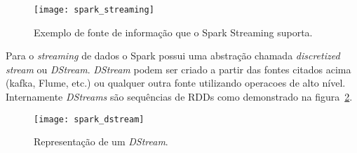 \begin{figure}[!h]
	\caption{\label{fig:sparkstreaming} Exemplo de fonte de informação que o Spark Streaming suporta.}
	\begin{center}
		\texttt{[image: spark\_streaming]}
	\end{center}
\end{figure}

Para o \textit{streaming} de dados o Spark possui uma abstração chamada \textit{discretized stream} ou \textit{DStream}. \textit{DStream} podem ser criado a partir das fontes citados acima (kafka, Flume, etc.) ou qualquer outra fonte utilizando operacoes de alto nível. Internamente \textit{DStreams} são sequências de RDDs como demonstrado na figura~\ref{fig:sparkdstream}.

\begin{figure}[!h]
	\caption{\label{fig:sparkdstream} Representação de um \textit{DStream}.}
	\begin{center}
		\texttt{[image: spark\_dstream]}
	\end{center}
\end{figure}
